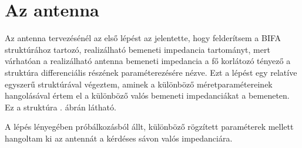 \section{Az antenna}
	Az antenna tervezésénél az első lépést az jelentette, hogy felderítsem a BIFA struktúrához tartozó, realizálható bemeneti impedancia tartományt, mert várhatóan a realizálható antenna bemeneti impedancia a fő korlátozó tényező a struktúra differenciális részének paraméterezésére nézve. Ezt a lépést egy relatíve egyszerű struktúrával végeztem, aminek a különböző méretparamétereinek hangolásával értem el a különböző valós bemeneti impedanciákat a bemeneten. Ez a struktúra . ábrán látható.
\par A lépés lényegében próbálkozásból állt, különböző rögzített paraméterek mellett hangoltam ki az antennát a kérdéses sávon valós impedanciára.